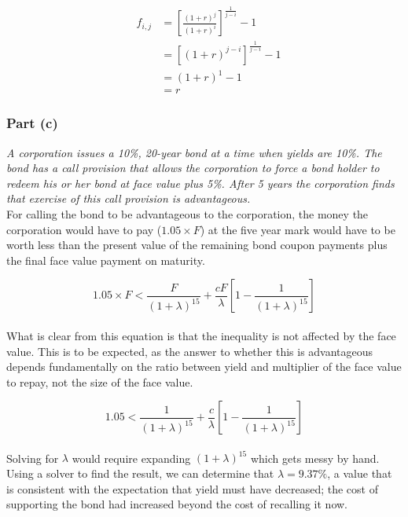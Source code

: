 \documentclass[11pt]{article}
\begin{document}
\setcounter{equation}{0}
\begin{eqnarray}
  & f_{i,j} &= \left[ \frac{\left(1+r\right)^{j}}{\left(1+r\right)^{i}} \right]^{\frac{1}{j-i}} -1 \\[3mm]
  &&= \left[ \left(1+r\right)^{j-i} \right]^{\frac{1}{j-i}} -1 \\[3mm]
  &&= \left(1+r\right)^{1} -1 \\[3mm]
  &&= r
\end{eqnarray}

\subsubsection*{Part (c)}

\textit{A corporation issues a 10\%, 20-year bond at a time when yields are 10\%. The
bond has a call provision that allows the corporation to force a bond holder to
redeem his or her bond at face value plus 5\%. After 5 years the corporation
finds that exercise of this call provision is advantageous.}\\

For calling the bond to be advantageous to the corporation, the money the corporation
would have to pay ($1.05 \times F$) at the five year mark would have to be worth less
than the present value of the remaining bond coupon payments plus the final face value
payment on maturity.

\[ 1.05 \times F < \frac{F}{\left(1+\lambda\right)^{15}} + \frac{cF}{\lambda}\left[1 - \frac{1}{\left(1+\lambda\right)^{15}}\right] \] \\

What is clear from this equation is that the inequality is not affected by the face
value. This is to be expected, as the answer to whether this is advantageous depends
fundamentally on the ratio between yield and multiplier of the face value to repay,
not the size of the face value.

\[ 1.05 < \frac{1}{\left(1+\lambda\right)^{15}} + \frac{c}{\lambda}\left[1 - \frac{1}{\left(1+\lambda\right)^{15}}\right] \] \\

Solving for $\lambda$ would require expanding $(1 + \lambda)^{15}$ which gets
messy by hand. Using a solver to find the result, we can determine that
$\lambda = 9.37\%$, a value that is consistent with the expectation that yield
must have decreased; the cost of supporting the bond had increased beyond the
cost of recalling it now.

\newpage
\end{document}
